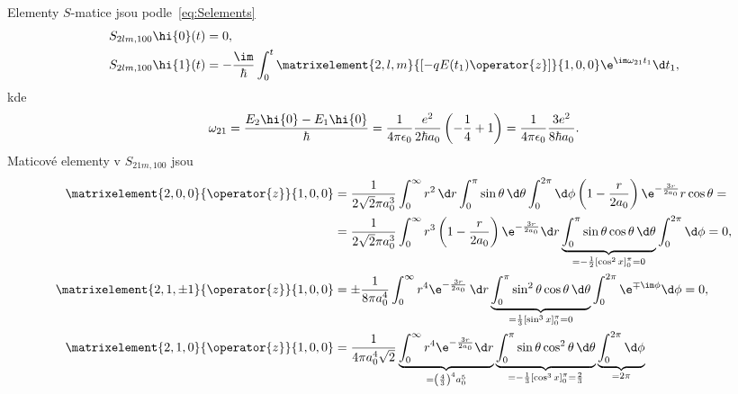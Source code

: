 \begin{solution}
    Elementy $S$-matice jsou podle~\eqref{eq:Selements}
    \begin{subequations}
        \begin{align}
            S_{2lm,100}\hi{0}(t)&=0,\\
            S_{2lm,100}\hi{1}(t)&=-\frac{\im}{\hbar}\int_{0}^{t}\matrixelement{2,l,m}{\left[-qE(t_{1})\operator{z}\right]}{1,0,0}\e^{\im\omega_{21}t_{1}}\d t_{1},
            \label{eq:SH2lm}
        \end{align}            
    \end{subequations}
    kde
    \begin{equation}
        \omega_{21}
            =\frac{E_{2}\hi{0}-E_{1}\hi{0}}{\hbar}
            =\frac{1}{4\pi\epsilon_{0}}\frac{e^{2}}{2\hbar a_{0}}\left(-\frac{1}{4}+1\right)
            =\frac{1}{4\pi\epsilon_{0}}\frac{3e^{2}}{8\hbar a_{0}}.
    \end{equation}
    Maticové elementy v $S_{21m,100}$ jsou
    \begin{subequations}
        \begin{align}
            \matrixelement{2,0,0}{\operator{z}}{1,0,0}
                &=\frac{1}{2\sqrt{2}\pi a_{0}^{3}}\int_{0}^{\infty}r^{2}\,\d r\int_{0}^{\pi}\sin{\theta}\,\d\theta\int_{0}^{2\pi}\d\phi \left(1-\frac{r}{2a_{0}}\right)\e^{-\frac{3r}{2a_{0}}}r\cos{\theta}=\nonumber\\
                &=\frac{1}{2\sqrt{2}\pi a_{0}^{3}}
                    \int_{0}^{\infty}r^{3}\left(1-\frac{r}{2a_{0}}\right)\e^{-\frac{3r}{2a_{0}}}\d r
                    \underbrace{\int_{0}^{\pi}\sin{\theta}\cos{\theta}\,\d\theta}_{=-\frac{1}{2}\left[\cos^{2}{x}\right]_{0}^{\pi}=0}
                    \int_{0}^{2\pi}\d\phi=0,\\
            \matrixelement{2,1,\pm1}{\operator{z}}{1,0,0}
                &=\pm\frac{1}{8\pi a_{0}^{4}}
                    \int_{0}^{\infty}r^{4}\e^{-\frac{3r}{2a_{0}}}\,\d r
                    \underbrace{\int_{0}^{\pi}\sin^{2}{\theta}\cos{\theta}\,\d\theta}_{=\frac{1}{3}\left[\sin^{3}{x}\right]_{0}^{\pi}=0}
                    \int_{0}^{2\pi}\e^{\mp\im\phi}\d\phi=0,\\
            \matrixelement{2,1,0}{\operator{z}}{1,0,0}
                &=\frac{1}{4\pi a_{0}^{4}\sqrt{2}}
                    \underbrace{\int_{0}^{\infty}r^{4}\e^{-\frac{3r}{2a_{0}}}\d r}_{=\left(\frac{4}{3}\right)^{4}a_{0}^{5}}
                    \underbrace{\int_{0}^{\pi}\sin{\theta}\cos^{2}\theta\,\d\theta}_{=-\frac{1}{3}\left[\cos^{3}{x}\right]_{0}^{\pi}=\frac{2}{3}}
                    \underbrace{\int_{0}^{2\pi}\d\phi}_{=2\pi}

\end{align}
\end{subequations}
\end{solution}
